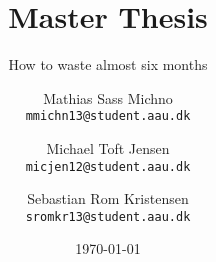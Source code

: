 \newcommand{\TITLE}{Master Thesis}
\newcommand{\SUBTITLE}{How to waste almost six months}
\newcommand{\GROUP}{deis1014f18}
\newcommand{\PERIOD}{Spring semester, 2018}
\newcommand{\MEMBERS}{%
    Mathias Sass Michno\\
    Michael Toft Jensen\\
    Sebastian Rom Kristensen
}
\newcommand{\SUPERVISOR}{Stefan Schmid\\René Rydhof Hansen}
\newcommand{\COMPLETION}{XX June, 2018}

\title{\TITLE}
\subtitle{\SUBTITLE}
\author{
    Mathias Sass Michno\\
    \texttt{mmichn13@student.aau.dk}
    \and
    Michael Toft Jensen\\
    \texttt{micjen12@student.aau.dk}
    \and
    Sebastian Rom Kristensen\\
    \texttt{sromkr13@student.aau.dk}
}
\date{\today}

